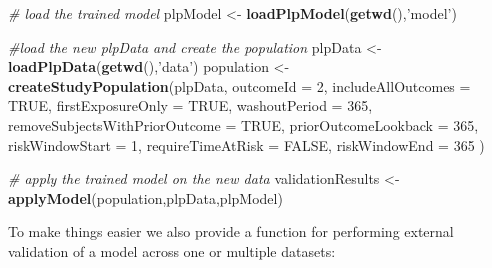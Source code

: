 \documentclass[]{article}
\newenvironment{Shaded}{\begin{snugshade}}{\end{snugshade}}
\newcommand{\KeywordTok}[1]{\textcolor[rgb]{0.13,0.29,0.53}{\textbf{#1}}}
\newcommand{\DataTypeTok}[1]{\textcolor[rgb]{0.13,0.29,0.53}{#1}}
\newcommand{\DecValTok}[1]{\textcolor[rgb]{0.00,0.00,0.81}{#1}}
\newcommand{\StringTok}[1]{\textcolor[rgb]{0.31,0.60,0.02}{#1}}
\newcommand{\CommentTok}[1]{\textcolor[rgb]{0.56,0.35,0.01}{\textit{#1}}}
\newcommand{\OtherTok}[1]{\textcolor[rgb]{0.56,0.35,0.01}{#1}}
\newcommand{\NormalTok}[1]{#1}
\begin{document}
\begin{Shaded}
\begin{Highlighting}[]
\CommentTok{# load the trained model}
\NormalTok{plpModel <-}\StringTok{ }\KeywordTok{loadPlpModel}\NormalTok{(}\KeywordTok{getwd}\NormalTok{(),}\StringTok{'model'}\NormalTok{)}

\CommentTok{#load the new plpData and create the population}
\NormalTok{plpData <-}\StringTok{ }\KeywordTok{loadPlpData}\NormalTok{(}\KeywordTok{getwd}\NormalTok{(),}\StringTok{'data'}\NormalTok{)}
\NormalTok{population <-}\StringTok{ }\KeywordTok{createStudyPopulation}\NormalTok{(plpData, }
\DataTypeTok{outcomeId =} \DecValTok{2}\NormalTok{, }
\DataTypeTok{includeAllOutcomes =} \OtherTok{TRUE}\NormalTok{, }
\DataTypeTok{firstExposureOnly =} \OtherTok{TRUE}\NormalTok{, }
\DataTypeTok{washoutPeriod =} \DecValTok{365}\NormalTok{, }
\DataTypeTok{removeSubjectsWithPriorOutcome =} \OtherTok{TRUE}\NormalTok{, }
\DataTypeTok{priorOutcomeLookback =} \DecValTok{365}\NormalTok{,}
\DataTypeTok{riskWindowStart =} \DecValTok{1}\NormalTok{,}
\DataTypeTok{requireTimeAtRisk =} \OtherTok{FALSE}\NormalTok{,}
\DataTypeTok{riskWindowEnd =} \DecValTok{365}
\NormalTok{)}

\CommentTok{# apply the trained model on the new data}
\NormalTok{validationResults <-}\StringTok{ }\KeywordTok{applyModel}\NormalTok{(population,plpData,plpModel)}
\end{Highlighting}
\end{Shaded}

To make things easier we also provide a function for performing external
validation of a model across one or multiple datasets:
\end{document}
